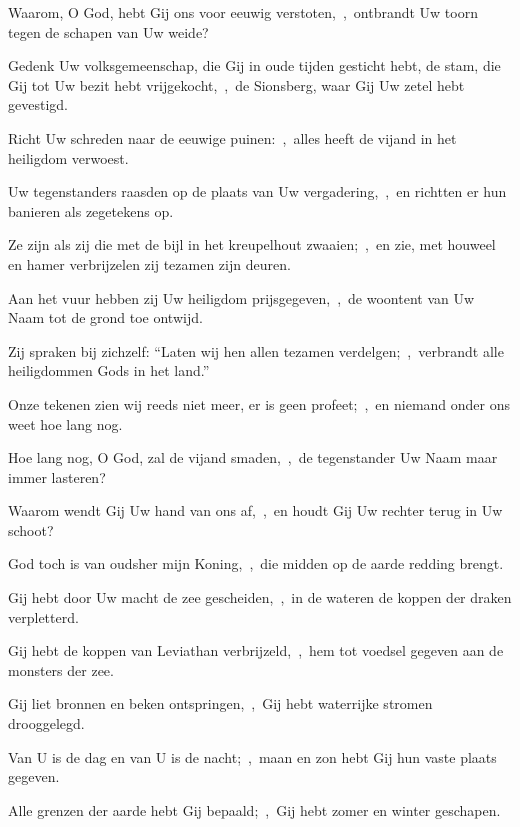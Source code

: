 \documentclass[12pt,twoside,a5paper]{article}
\begin{document}


\begin{halfparskip}
  Waarom, O God, hebt Gij ons voor eeuwig verstoten,~\sep\ ontbrandt Uw toorn tegen de schapen van Uw weide?


  Gedenk Uw volksgemeenschap, die Gij in oude tijden gesticht hebt, de stam, die Gij tot Uw bezit hebt vrijgekocht,~\sep\ de Sionsberg, waar Gij Uw zetel hebt gevestigd.

  Richt Uw schreden naar de eeuwige puinen:~\sep\ alles heeft de vijand in het heiligdom verwoest.

  Uw tegenstanders raasden op de plaats van Uw vergadering,~\sep\ en richtten er hun banieren als zegetekens op.

  Ze zijn als zij die met de bijl in het kreupelhout zwaaien;~\sep\ en zie, met houweel en hamer verbrijzelen zij tezamen zijn deuren.

  Aan het vuur hebben zij Uw heiligdom prijsgegeven,~\sep\ de woontent van Uw Naam tot de grond toe ontwijd.

  Zij spraken bij zichzelf: ``Laten wij hen allen tezamen verdelgen;~\sep\ verbrandt alle heiligdommen Gods in het land.''

  Onze tekenen zien wij reeds niet meer, er is geen profeet;~\sep\ en niemand onder ons weet hoe lang nog.

  Hoe lang nog, O God, zal de vijand smaden,~\sep\ de tegenstander Uw Naam maar immer lasteren?

  Waarom wendt Gij Uw hand van ons af,~\sep\ en houdt Gij Uw rechter terug in Uw schoot?
\end{halfparskip}


\begin{halfparskip}
  God toch is van oudsher mijn Koning,~\sep\ die midden op de aarde redding brengt.

  Gij hebt door Uw macht de zee gescheiden,~\sep\ in de wateren de koppen der draken verpletterd.

  Gij hebt de koppen van Leviathan verbrijzeld,~\sep\ hem tot voedsel gegeven aan de monsters der zee.

  Gij liet bronnen en beken ontspringen,~\sep\ Gij hebt waterrijke stromen drooggelegd.

  Van U is de dag en van U is de nacht;~\sep\ maan en zon hebt Gij hun vaste plaats gegeven.

  Alle grenzen der aarde hebt Gij bepaald;~\sep\ Gij hebt zomer en winter geschapen.
\end{halfparskip}
\end{document}

